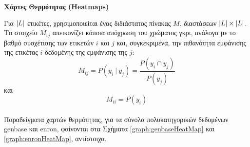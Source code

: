 \begin{description}
\item \textbf{Χάρτες Θερμότητας (Heatmaps)}

Για $\lvert L\rvert$ ετικέτες, χρησιμοποιείται ένας διδιάστατος πίνακας $M$, διαστάσεων $\lvert L\rvert \times \lvert L\rvert$. Το στοιχείο $M_{ij}$ απεικονίζει κάποια απόχρωση του χρώματος γκρι, ανάλογα με το βαθμό συσχέτισης των ετικετών $i$ και $j$ και, συγκεκριμένα, την πιθανότητα εμφάνισης της ετικέτας $i$ δεδομένης της εμφάνισης της $j$:
\begin{equation} 
M_{ij}=P(y_{i} \: | \: y_{j}) = \frac{P(y_{i} \cap y_{j})}{P(y_{j})} 
\end{equation}  
και 
\begin{equation} 
M_{ii}=P(y_{i}) 
\end{equation}
\\
Παραδείγματα χαρτών θερμότητας, για τα σύνολα πολυκατηγορικών δεδομένων genbase και enron, φαίνονται στα Σχήματα \ref{graph:genbaseHeatMap} και \ref{graph:enronHeatMap}, αντίστοιχα.




\end{description}
